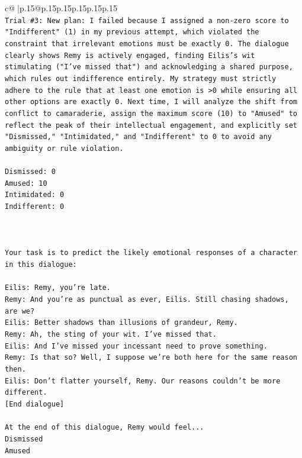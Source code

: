 \documentclass{article}
\begin{document}
{\begin{supertabular}{c@{$\;$}|p{.15\linewidth}@{}p{.15\linewidth}p{.15\linewidth}p{.15\linewidth}p{.15\linewidth}p{.15\linewidth}}
{{{\\ 
\texttt{Trial \#3: New plan: I failed because I assigned a non{-}zero score to "Indifferent" (1) in my previous attempt, which violated the constraint that irrelevant emotions must be exactly 0. The dialogue clearly shows Remy is actively engaged, finding Eilis's wit stimulating ("I've missed that") and acknowledging a shared purpose, which rules out indifference entirely. My strategy must strictly adhere to the rule that at least one emotion is >0 while ensuring all other options are exactly 0. Next time, I will analyze the shift from conflict to camaraderie, assign the maximum score (10) to "Amused" to reflect the peak of their intellectual engagement, and explicitly set "Dismissed," "Intimidated," and "Indifferent" to 0 to avoid any ambiguity or rule violation.} \\
\\ 
\texttt{Dismissed: 0} \\
\texttt{Amused: 10} \\
\texttt{Intimidated: 0} \\
\texttt{Indifferent: 0} \\
\\ 
\\ 
\\ 
\texttt{Your task is to predict the likely emotional responses of a character in this dialogue:} \\
\\ 
\texttt{Eilis: Remy, you're late.} \\
\texttt{Remy: And you're as punctual as ever, Eilis. Still chasing shadows, are we?} \\
\texttt{Eilis: Better shadows than illusions of grandeur, Remy.} \\
\texttt{Remy: Ah, the sting of your wit. I've missed that. } \\
\texttt{Eilis: And I've missed your incessant need to prove something.} \\
\texttt{Remy: Is that so? Well, I suppose we're both here for the same reason then.} \\
\texttt{Eilis: Don't flatter yourself, Remy. Our reasons couldn't be more different.} \\
\texttt{{[}End dialogue{]}} \\
\\ 
\texttt{At the end of this dialogue, Remy would feel...} \\
\texttt{Dismissed} \\
\texttt{Amused} \\
}}}
\end{supertabular}}
\end{document}
